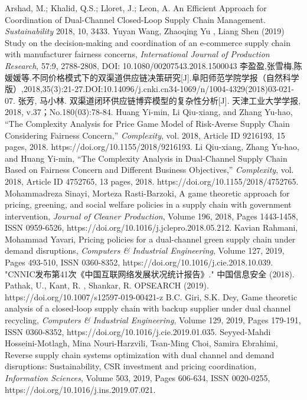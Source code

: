 \documentclass{article}
\begin{document}
\begin{thebibliography}{1}
 Arshad, M.; Khalid, Q.S.; Lloret, J.; Leon, A. An Efficient Approach for Coordination of Dual-Channel Closed-Loop Supply Chain Management. \emph{Sustainability} 2018, 10, 3433.
 Yuyan Wang, Zhaoqing Yu , Liang Shen (2019) Study on the decision-making and coordination of an e-commerce supply chain with manufacturer fairness concerns, \emph{International Journal of Production Research}, 57:9, 2788-2808, DOI: 10.1080/00207543.2018.1500043
 李盈盈,张雪梅,陈媛媛等.不同价格模式下的双渠道供应链决策研究[J].阜阳师范学院学报（自然科学版）,2018,35(3):21-27.DOI:10.14096/j.cnki.cn34-1069/n/1004-4329(2018)03-021-07.
 张芳, 马小林. 双渠道闭环供应链博弈模型的复杂性分析[J]. 天津工业大学学报, 2018, v.37；No.180(03):78-84.
 Huang Yi-min, Li Qiu-xiang, and Zhang Yu-hao, “The Complexity Analysis for Price Game Model of Risk-Averse Supply Chain Considering Fairness Concern,” \emph{Complexity}, vol. 2018, Article ID 9216193, 15 pages, 2018. https://doi.org/10.1155/2018/9216193.
 Li Qiu-xiang, Zhang Yu-hao, and Huang Yi-min, “The Complexity Analysis in Dual-Channel Supply Chain Based on Fairness Concern and Different Business Objectives,” \emph{Complexity}, vol. 2018, Article ID 4752765, 13 pages, 2018. https://doi.org/10.1155/2018/4752765.
 Mohammadreza Sinayi, Morteza Rasti-Barzoki, A game theoretic approach for pricing, greening, and social welfare policies in a supply chain with government intervention, \emph{Journal of Cleaner Production}, Volume 196, 2018, Pages 1443-1458, ISSN 0959-6526, https://doi.org/10.1016/j.jclepro.2018.05.212.
 Kavian Rahmani, Mohammad Yavari, Pricing policies for a dual-channel green supply chain under demand disruptions, \emph{Computers \& Industrial Engineering}, Volume 127, 2019, Pages 493-510, ISSN 0360-8352, https://doi.org/10.1016/j.cie.2018.10.039.
 "CNNIC发布第41次《中国互联网络发展状况统计报告》." 中国信息安全 (2018).
 Pathak, U., Kant, R. , Shankar, R. OPSEARCH (2019). https://doi.org/10.1007/s12597-019-00421-z
 B.C. Giri, S.K. Dey, Game theoretic analysis of a closed-loop supply chain with backup supplier under dual channel recycling, \emph{Computers \& Industrial Engineering}, Volume 129, 2019, Pages 179-191, ISSN 0360-8352, https://doi.org/10.1016/j.cie.2019.01.035. 
 Seyyed-Mahdi Hosseini-Motlagh, Mina Nouri-Harzvili, Tsan-Ming Choi, Samira Ebrahimi, Reverse supply chain systems optimization with dual channel and demand disruptions: Sustainability, CSR investment and pricing coordination, \emph{Information Sciences}, Volume 503, 2019, Pages 606-634, ISSN 0020-0255, https://doi.org/10.1016/j.ins.2019.07.021.

\end{thebibliography}
\end{document}
